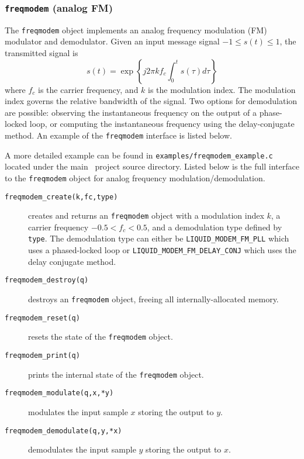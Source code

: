 \subsubsection{{\tt freqmodem} (analog FM)}
\label{module:modem:analog:freqmodem}
The {\tt freqmodem} object implements an analog frequency modulation
(FM) modulator and demodulator.
Given an input message signal $-1 \le s(t) \le 1$, the transmitted
signal is
%
\begin{equation}
\label{eqn:modem:freqmodem_tx}
    s(t) =  \exp\left\{
                j 2 \pi k f_c
                \int_{0}^{t}{
                    s(\tau)d\tau
                }
            \right\}
\end{equation}
%
where $f_c$ is the carrier frequency, and $k$ is the modulation index.
The modulation index governs the relative bandwidth of the signal.
Two options for demodulation are possible:
observing the instantaneous frequency on the output of a phase-locked
loop,
or computing the instantaneous frequency using the delay-conjugate
method.
%
An example of the {\tt freqmodem} interface is listed below.
%

%
A more detailed example can be found in
{\tt examples/freqmodem\_example.c}
located under the main \liquid\ project source directory.
Listed below is the full interface to the {\tt freqmodem} object for
analog frequency modulation/demodulation.
%
\begin{description}
\item[{\tt freqmodem\_create(k,fc,type)}]
    creates and returns an {\tt freqmodem} object with a modulation
    index $k$, a carrier frequency $-0.5 < f_c < 0.5$, and a
    demodulation type defined by {\tt type}.
    The demodulation type can either be
    {\tt LIQUID\_MODEM\_FM\_PLL} which uses a phased-locked loop or
    {\tt LIQUID\_MODEM\_FM\_DELAY\_CONJ} which uses the delay conjugate
    method.
\item[{\tt freqmodem\_destroy(q)}]
    destroys an {\tt freqmodem} object, freeing all internally-allocated
    memory.
\item[{\tt freqmodem\_reset(q)}]
    resets the state of the {\tt freqmodem} object.
\item[{\tt freqmodem\_print(q)}]
    prints the internal state of the {\tt freqmodem} object.
\item[{\tt freqmodem\_modulate(q,x,*y)}]
    modulates the input sample $x$ storing the output to $y$.
\item[{\tt freqmodem\_demodulate(q,y,*x)}]
    demodulates the input sample $y$ storing the output to $x$.
\end{description}

